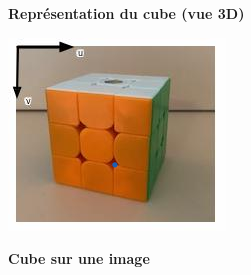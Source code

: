 \begin{frame}
\begin{minipage}{0.48\textwidth}
    {\footnotesize\textbf{Représentation du cube (vue 3D)}}
\end{minipage}
\hfill
\begin{minipage}{0.48\textwidth}
    \centering
    \includegraphics[width=\linewidth]{capture/cube_repere.png}
    \vspace{0.5em}

    {\footnotesize\textbf{Cube sur une image}}
\end{minipage}

\end{frame}


